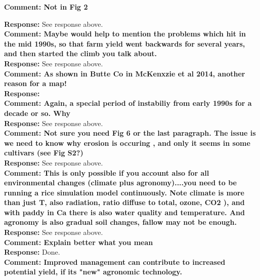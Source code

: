 \documentclass{article} \usepackage[margin=1in]{geometry}
\begin{document}
\textbf{Comment: Not in Fig 2}

\textbf{Response: } See response above.\\

\textbf{Comment: Maybe would help to mention the problems which hit in
  the mid 1990s, so that farm yield went backwards for several years,
  and then started the climb you talk about.}\\

\textbf{Response: } See response above.\\

\textbf{Comment: As shown in Butte Co in McKenxzie et al 2014, another
  reason for a map!}\\

\textbf{Response:}\\

\textbf{Comment: Again, a special period of instabiliy from early
  1990s for a decade or so. Why} \\

\textbf{Response: } See response above.\\

\textbf{Comment: Not sure you need Fig 6 or the last paragraph. The
  issue is we need to know why erosion is occuring , and only it seems
  in some cultivars (see Fig S2?)}\\

\textbf{Response: } See response above.\\

\textbf{Comment: This is only possible if you account also for all
  environmental changes (climate plus agronomy)....you need to be
  running a rice simulation model continuously. Note climate is more
  than just T, also radiation, ratio diffuse to total, ozone, CO2 ),
  and with paddy in Ca there is also water quality and
  temperature. And agronomy is also gradual soil changes, fallow may
  not be enough.}\\

\textbf{Response: } See response above.\\

\textbf{Comment: Explain better what you mean}\\

\textbf{Response: } Done.\\

\textbf{Comment: Improved management can contribute to increased
  potential yield, if its "new" agronomic technology.}\\
\end{document}
